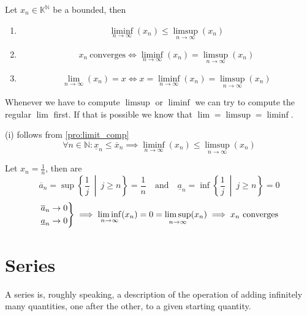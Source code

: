 \begin{theorem}\label{thm:limsup_inf_rules}
   Let \(x_n \in \mathbb{K}^\mathbb{N}\) be a bounded, then
   \begin{enumerate}[label=\roman*, align=Center]
      \item \[\liminf_{n \to \infty}(x_n) \leq \limsup_{n \to \infty}(x_n)\]
      \item \[x_n~\text{converges} \iff \liminf_{n \to \infty}(x_n) = \limsup_{n \to \infty}(x_n)\]
         \item \[\lim_{n \to \infty}(x_n) = x \iff x = \liminf_{n \to \infty}(x_n) = \limsup_{n \to \infty}(x_n)\]
   \end{enumerate}
\end{theorem}
\begin{remark}[Tips]
   Whenever we have to compute \(\limsup\) or \(\liminf\) we can try to compute the regular \(\lim\) first.
   If that is possible we know that \(\lim = \limsup = \liminf\).
\end{remark}
\begin{remark}
   (i) follows from \cref{pro:limit_comp}
   \[\forall n \in \mathbb{N}: \underline{x}_n \leq \overline{x}_n \implies \liminf_{n \to \infty}(x_n) \leq \limsup_{n \to \infty}(x_n)\]
\end{remark}
\begin{example}
   Let \(x_n = \frac{1}{n}\), then are
   \[\overline{a}_n = \sup\left\{\frac{1}{j}~\middle|~j \geq n\right\} = \frac{1}{n} \quad\text{and}\quad \underline{a}_n = \inf\left\{\frac{1}{j}~\middle|~j \geq n\right\} = 0\]
   \[\begin{drcases}
      \overline{a}_n \to 0\\
      \underline{a}_n \to 0
   \end{drcases} \implies \liminf_{n \to \infty}(x_n) = 0 = \limsup_{n \to \infty}(x_n) \implies x_n~\text{converges}\]
\end{example}

\newpage

\section{Series}
A series is, roughly speaking, a description of the operation of adding infinitely many quantities, one after the other, to a given starting quantity.

